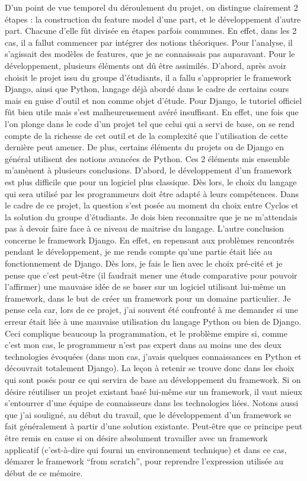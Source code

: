 D'un point de vue temporel du déroulement du projet,  on distingue clairement 2 étapes : la construction du feature model d'une part,  et le développement d'autre part.  Chacune d'elle fût divisée en étapes parfois communes.  En effet,  dans les 2 cas,  il a fallut commencer par intégrer des notions théoriques.  Pour l'analyse,  il s'agissait des modèles de features,  que je ne connaissais pas auparavant.  Pour le développement,  plusieurs éléments ont dû être assimilés.  D'abord,  après avoir choisit le projet issu du groupe d'étudiants,  il a fallu s'approprier le framework Django,  ainsi que Python,  langage déjà abordé dans le cadre de certains cours mais en guise d'outil et non comme objet d'étude.  Pour Django,  le tutoriel officiel fût bien utile mais s'est malheureusement avéré insuffisant.  En effet,  une fois que l'on plonge dans le code d'un projet tel que celui qui a servi de base,  on se rend compte de la richesse de cet outil et de la complexité que l'utilisation de cette dernière peut amener.  De plus,  certains éléments du projets ou de Django en général utilisent des notions avancées de Python.  Ces 2 éléments mis ensemble m'amènent à plusieurs conclusions.  D'abord,  le développement d'un framework est plus difficile que pour un logiciel plus classique.  Dès lors,  le choix du langage qui sera utilisé par les programmeurs doit être adapté à leurs compétences.  Dans le cadre de ce projet,  la question s'est posée au moment du choix entre Cyclos et la solution du groupe d'étudiants.  Je dois bien reconnaitre que je ne m'attendais pas à devoir faire face à ce niveau de maitrise du langage.  L'autre conclusion concerne le framework Django.   En effet,  en repensant aux problèmes rencontrés pendant le développement,  je me rends compte qu'une partie était liée au fonctionnement de Django.  Dès lors,  je fais le lien avec le choix pré-cité et je pense que c'est peut-être (il faudrait mener une étude comparative pour pouvoir l'affirmer) une mauvaise idée de se baser sur un logiciel utilisant lui-même un framework,  dans le but de créer un framework pour un domaine particulier.  Je pense cela car,  lors de ce projet,  j'ai souvent été confronté à me demander si une erreur était liée à une mauvaise utilisation du langage Python ou bien de Django.  Ceci complique beaucoup la programmation,  et le problème empire si,  comme c'est mon cas,  le programmeur n'est pas expert dans au moins une des deux technologies évoquées (dans mon cas,  j'avais quelques connaissances en Python et découvrait totalement Django).  La leçon à retenir se trouve donc dans les choix qui sont posés pour ce qui servira de base au développement du framework.  Si on désire réutiliser un projet existant basé lui-même sur un framework,  il vaut mieux s'entourrer d'une équipe de connaisseurs dans les technologies liées.  Notons aussi que j'ai souligné,  au début du travail,  que le développement d'un framework se fait généralement à partir d'une solution existante.  Peut-être que ce principe peut être remis en cause si on désire absolument travailler avec un framework applicatif (c'est-à-dire qui fourni un environnement technique) et dans ce cas,  démarer le framework ``from scratch'',  pour reprendre l'expression utilisée au début de ce mémoire.


